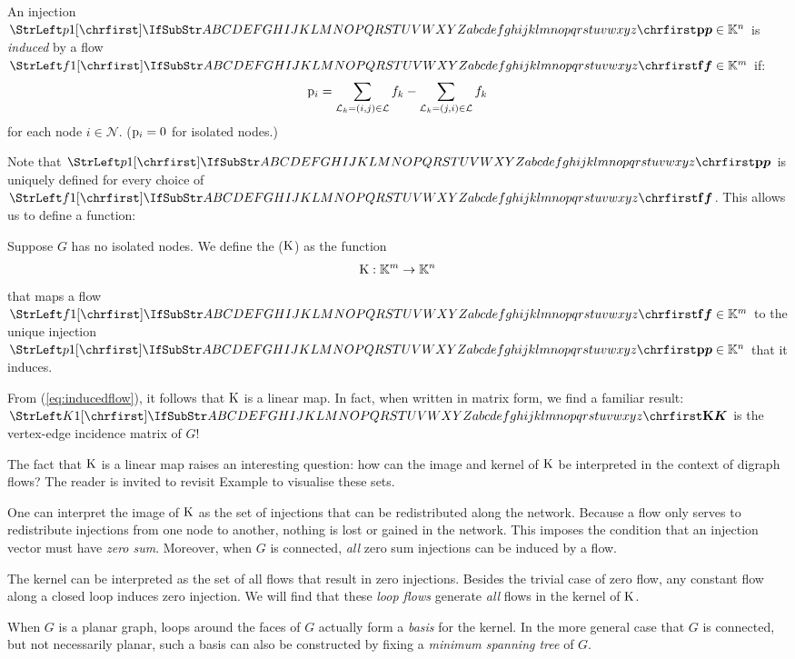 \documentclass[main.tex]{subfiles}
\begin{document}
\begin{definition}\label{def:inducedinjection}
An injection $\mat{p} \in \mathbb{K}^n$ is \emph{induced} by a flow $\mat{f} \in \mathbb{K}^m$ if:
\begin{gather}
    {\mathrm{p}}_i =
    \sum_{\mathcal{L}_k=(i,j) \in \mathcal{L}} f_k -
    \sum_{\mathcal{L}_k=(j,i) \in \mathcal{L}} f_k \label{eq:inducedflow}
\end{gather}
for each node $i \in \mathcal{N}$. (${\mathrm{p}}_i = 0$ for isolated nodes.)
\end{definition}
Note that $\mat{p}$ is uniquely defined for every choice of $\mat{f}$. This allows us to define a function:
\begin{definition}
Suppose $G$ has no isolated nodes. We define the  ($\text{\textup{K}}$) as the function
\begin{gather*}
    \text{\textup{K}}: \mathbb{K}^m \rightarrow \mathbb{K}^n
\end{gather*}
that maps a flow $\mat{f} \in \mathbb{K}^m$ to the unique injection $\mat{p} \in \mathbb{K}^n$ that it induces.
\end{definition}

From (\ref{eq:inducedflow}), it follows that $\text{\textup{K}}$ is a linear map. In fact, when written in matrix form, we find a familiar result: $\mat{K}$ is the vertex-edge incidence matrix of $G$! 

The fact that $\text{\textup{K}}$ is a linear map raises an interesting question: how can the image and kernel of $\text{\textup{K}}$ be interpreted in the context of digraph flows?
The reader is invited to revisit Example  to visualise these sets.

One can interpret the image of $\text{\textup{K}}$ as the set of injections that can be redistributed along the network. Because a flow only serves to redistribute injections from one node to another, nothing is lost or gained in the network. This imposes the condition that an injection vector must have \emph{zero sum}. Moreover, when $G$ is connected, \emph{all} zero sum injections can be induced by a flow.

The kernel can be interpreted as the set of all flows that result in zero injections. Besides the trivial case of zero flow, any constant flow along a closed loop induces zero injection. We will find that these \emph{loop flows} generate \emph{all} flows in the kernel of $\text{\textup{K}}$.

When $G$ is a planar graph, loops around the faces of $G$ actually form a \emph{basis} for the kernel. In the more general case that $G$ is connected, but not necessarily planar, such a basis can also be constructed by fixing a \emph{minimum spanning tree} of $G$.
\end{document}

